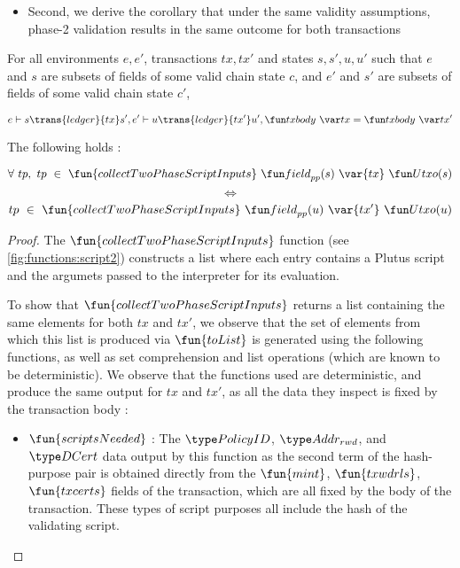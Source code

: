 \begin{property}
\begin{itemize}
  \item Second, we derive the corollary that under the same validity assumptions,
  phase-2 validation results in the same outcome for both transactions
\end{itemize}

\begin{lemma}
  \label{lem:inputs}
  For all environments $e, e'$, transactions $tx, tx'$ and states $s, s', u, u'$ such that
  $e$ and $s$ are subsets of fields of some valid chain state $c$, and
  $e'$ and $s'$ are subsets of fields of some valid chain state $c'$,

  \begin{equation*}
    e\vdash s\trans{ledger}{tx}s', \\
    e'\vdash u\trans{ledger}{tx'}u', \\
    \txbody{tx} = \txbody{tx'}
  \end{equation*}

  The following holds :

  \[\forall ~tp,~tp~\in~\fun{collectTwoPhaseScriptInputs} ~\field_{pp}(s)~\var{tx}~ \Utxo(s)\]
  \[ \Leftrightarrow \]
  \[tp~\in~\fun{collectTwoPhaseScriptInputs} ~\field_{pp}(u)~\var{tx'}~ \Utxo(u)\]

\end{lemma}
\begin{proof}

    The $\fun{collectTwoPhaseScriptInputs}$
    function (see \ref{fig:functions:script2})
    constructs a list where each entry contains a Plutus script
    and the argumets passed to the interpreter for its evaluation.

    To show that $\fun{collectTwoPhaseScriptInputs}$ returns a list containing
    the same elements for both $tx$ and $tx'$,
    we observe that
    the set of elements from which this list is produced via $\fun{toList}$
    is generated using the following functions, as well as set comprehension
    and list operations (which are known to be deterministic).
    We observe that the functions used are deterministic,
    and produce the same output for $tx$ and $tx'$, as all the data they
    inspect is fixed by the transaction body :

    \begin{itemize}
      \item $\fun{scriptsNeeded}$ : The $\PolicyID$, $\AddrRWD$, and $\DCert$ data
      output by this function as the second term of the hash-purpose pair
      is obtained directly from the $\fun{mint}$, $\fun{txwdrls}$,
      $\fun{txcerts}$ fields of the transaction, which are all fixed by the
      body of the transaction. These types of script purposes all include
      the hash of the validating script.


\end{itemize}
\end{proof}
\end{property}
